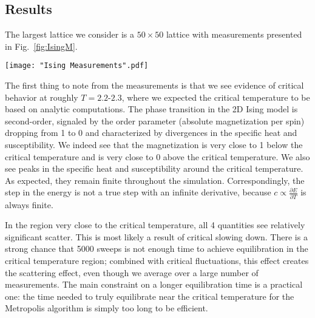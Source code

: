 \documentclass[twocolumn,aps,prl]{revtex4-1} %
\newcommand{\pd}{\partial}
\begin{document}
\subsection{Results}
The largest lattice we consider is a $50 \times 50$ lattice with measurements presented in Fig.~\ref{fig:IsingM}.
\begin{figure*}
	\texttt{[image: "Ising Measurements".pdf]}
	\caption{\label{fig:IsingM}Plots showing the mean energy per spin, specific heat per spin, mean (absolute) magnetization per spin, magnetic susceptibility on a 50 $\times$ 50 lattice from $T = 1.6$ to $T = 2.9$ in increments of $\Delta T = .01$. The lines overlaid on the data are lines of best-of-fit determined using \texttt{optimize.curve\_fit}. The equilibration time at each temperature is 5000 sweeps and each data point is obtained from 5000 measurements. The error bars computed using the bootstrap method are too small to see.}
\end{figure*}

The first thing to note from the measurements is that we see evidence of critical behavior at roughly $T = 2.2$-$2.3$, where we expected the critical temperature to be based on analytic computations. The phase transition in the 2D Ising model is second-order, signaled by the order parameter (absolute magnetization per spin) dropping from 1 to 0 and characterized by divergences in the specific heat and susceptibility. We indeed see that the magnetization is very close to 1 below the critical temperature and is very close to 0 above the critical temperature. We also see peaks in the specific heat and susceptibility around the critical temperature. As expected, they remain finite throughout the simulation. Correspondingly, the step in the energy is not a true step with an infinite derivative, because $c \propto \frac{\pd E}{\pd T}$ is always finite.

In the region very close to the critical temperature, all 4 quantities see relatively significant scatter. This is most likely a result of critical slowing down. There is a strong chance that 5000 sweeps is not enough time to achieve equilibration in the critical temperature region; combined with critical fluctuations, this effect creates the scattering effect, even though we average over a large number of measurements. The main constraint on a longer equilibration time is a practical one: the time needed to truly equilibrate near the critical temperature for the Metropolis algorithm is simply too long to be efficient.
\end{document}
